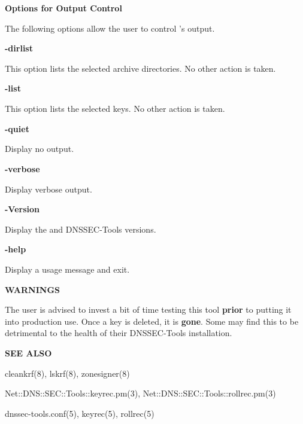 {\bf Options for Output Control}

The following options allow the user to control 's output.

\begin{description}

\item {\bf -dirlist}\verb" "

This option lists the selected archive directories.  No other action is taken.

\item {\bf -list}\verb" "

This option lists the selected keys.  No other action is taken.

\item {\bf -quiet}\verb" "

Display no output.

\item {\bf -verbose}\verb" "

Display verbose output.

\item {\bf -Version}\verb" "

Display the  and DNSSEC-Tools versions.

\item {\bf -help}\verb" "

Display a usage message and exit.

\end{description}

{\bf WARNINGS}

The user is advised to invest a bit of time testing this tool {\bf prior}
to putting it into production use.  Once a key is deleted, it is {\bf gone}.
Some may find this to be detrimental to the health of their DNSSEC-Tools
installation.

{\bf SEE ALSO}

cleankrf(8),
lskrf(8),
zonesigner(8)

Net::DNS::SEC::Tools::keyrec.pm(3),
Net::DNS::SEC::Tools::rollrec.pm(3)

dnssec-tools.conf(5),
keyrec(5),
rollrec(5)

